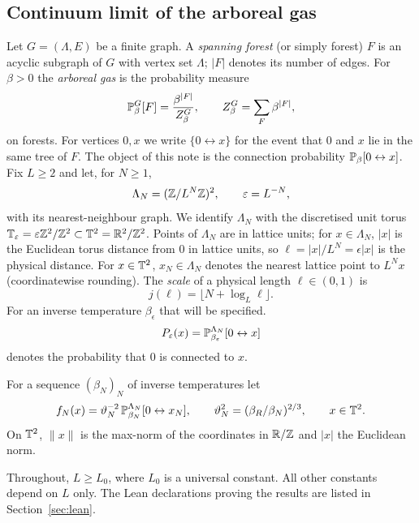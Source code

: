 \documentclass[11pt]{amsart}
\numberwithin{equation}{section}
\numberwithin{theorem}{section}
\newcommand{\conn}{\leftrightarrow}
\begin{document}
\subsection{Continuum limit of the arboreal gas}
Let $G=(\Lambda,E)$ be a finite graph. A \emph{spanning forest} (or simply forest) $F$ is an acyclic subgraph of
$G$ with vertex set $\Lambda$; $|F|$ denotes its number of edges. For $\beta>0$ the
\emph{arboreal gas} is the probability measure
\begin{equation}\label{e:P-forest}
  \mathbb{P}_\beta^G[F] = \frac{\beta^{|F|}}{Z_\beta^G},\qquad
  Z_\beta^G=\sum_{F} \beta^{|F|},
\end{equation}
on forests. For vertices $0,x$ we write $\{0\conn x\}$ for the event that $0$ and $x$ lie in the
same tree of $F$. The object of this note is the connection probability $\P_\beta[0\conn x]$.
%
Fix $L\ge2$ and let, for $N\ge1$,
\begin{equation}
  \Lambda_N=(\mathbb{Z}/L^N\mathbb{Z})^2,\qquad \varepsilon=L^{-N},
\end{equation}
with its nearest-neighbour graph. We identify $\Lambda_N$ with the discretised unit torus
$\mathbb{T}_\varepsilon=\varepsilon\mathbb{Z}^2/\mathbb{Z}^2\subset\mathbb{T}^2=\mathbb{R}^2/\mathbb{Z}^2$. Points of $\Lambda_N$ are in lattice units;
for $x\in\Lambda_N$, $|x|$ is the Euclidean torus distance from $0$ in lattice units, so
$\ell=|x|/L^N=\epsilon|x|$ is the physical distance. For $x\in\mathbb{T}^2$, $x_N\in\Lambda_N$ denotes the
nearest lattice point to $L^Nx$ (coordinatewise rounding). The \emph{scale} of a physical length
$\ell\in(0,1)$ is
\begin{equation}
  j(\ell)=\lfloor N+\log_L\ell\rfloor .
\end{equation}
For an inverse temperature $\beta_\epsilon$ that will be specified.
\begin{equation}
  P_\epsilon(x)=\P^{\Lambda_N}_{\beta_\epsilon}[0\conn x]
\end{equation}
denotes the probability that $0$ is connected to $x$.

For a sequence $(\beta_N)_N$ of inverse temperatures let
\begin{equation}
  f_N(x)=\vartheta_N^{-2}\,\P^{\Lambda_N}_{\beta_N}[0\conn x_N],\qquad
  \vartheta_N^2=(\beta_R/\beta_N)^{2/3},\qquad x\in\T^2 .
\end{equation}
On $\mathbb{T}^2$, $\|x\|$ is the max-norm of the coordinates in $\mathbb{R}/\mathbb{Z}$ and $|x|$ the Euclidean norm.

Throughout, $L\ge L_0$, where $L_0$ is a universal constant. All other constants depend on $L$ only.
The Lean declarations proving the results are listed in Section~\ref{sec:lean}.
\end{document}
